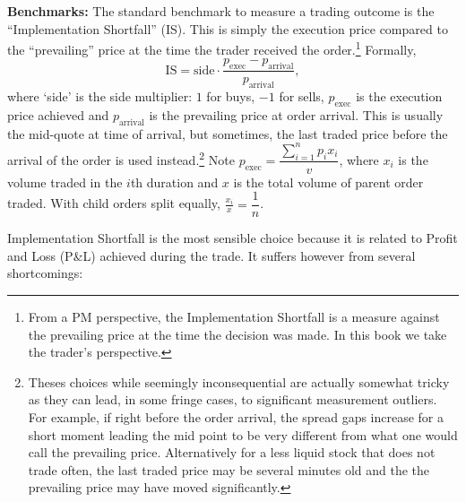 \noindent\textbf{Benchmarks:} The standard benchmark to measure a trading outcome is the ``Implementation Shortfall'' (IS). This is simply the execution price compared to the ``prevailing'' price at the time the trader received the order.\footnote{From a PM perspective, the Implementation Shortfall is a measure against the prevailing price at the time the decision was made. In this book we take the trader's perspective.} Formally,
        \begin{equation}
        \text{IS} = \text{side} \cdot \frac{p_{\text{exec}} - p_{\text{arrival}}}{p_{\text{arrival}}},
        \end{equation}
where `side' is the side multiplier: $1$ for buys, $-1$ for sells, $p_{\text{exec}}$ is the execution price achieved and $p_{\text{arrival}}$ is the prevailing price at order arrival. This is usually the mid-quote at time of arrival, but sometimes, the last traded price before the arrival of the order is used instead.\footnote{Theses choices while seemingly inconsequential are actually somewhat tricky as they can lead, in some fringe cases, to significant measurement outliers. For example, if right before the order arrival, the spread gaps increase for a short moment leading the mid point to be very different from what one would call the prevailing price. Alternatively for a less liquid stock that does not trade often, the last traded price may be several minutes old and the the prevailing price may have moved significantly.} Note $p_\text{exec}= \dfrac{\sum_{i=1}^n p_i x_i}{v}$, where $x_i$ is the volume traded in the $i$th duration and $x$ is the total volume of parent order traded. With child orders split equally, $\frac{x_i}{x}= \dfrac{1}{n}$.


Implementation Shortfall is the most sensible choice because it is related to Profit and Loss (P\&L) achieved during the trade.  It suffers however from several shortcomings:

